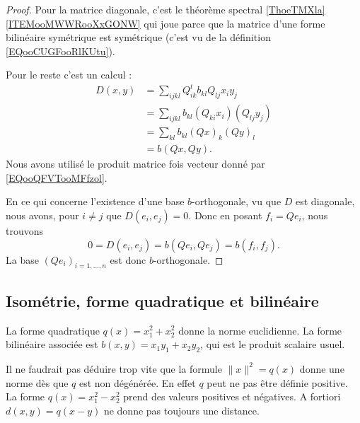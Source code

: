 \begin{proof}
    Pour la matrice diagonale, c'est le théorème spectral \ref{ThoeTMXla}\ref{ITEMooMWWRooXxGONW} qui joue parce que la matrice d'une forme bilinéaire symétrique est symétrique (c'est vu de la définition \eqref{EQooCUGFooRlKUtu}).

    Pour le reste c'est un calcul :
    \begin{subequations}
        \begin{align}
            D(x,y)&=\sum_{ijkl}Q^t_{ik}b_{kl}Q_{lj}x_iy_j\\
            &=\sum_{ijkl}b_{kl}(Q_{ki}x_i)(Q_{lj}y_j)\\
            &=\sum_{kl}b_{kl}(Qx)_k(Qy)_l\\
            &=b(Qx,Qy).
        \end{align}
    \end{subequations}
    Nous avons utilisé le produit matrice fois vecteur donné par \eqref{EQooQFVTooMFfzol}.

    En ce qui concerne l'existence d'une base \( b\)-orthogonale, vu que \( D\) est diagonale, nous avons, pour \( i\neq j\) que \( D(e_i,e_j)=0\). Donc en posant \( f_i=Qe_i\), nous trouvons
    \begin{equation}
        0=D(e_i,e_j)=b(Qe_i,Qe_j)=b(f_i,f_j).
    \end{equation}
    La base \( (Qe_i)_{i=1,\ldots, n}\) est donc \( b\)-orthogonale.
\end{proof}

\subsection{Isométrie, forme quadratique et bilinéaire}

\begin{example}
    La forme quadratique \( q(x)=x_1^2+x_2^2\) donne la norme euclidienne. La forme bilinéaire associée est \( b(x,y)=x_1y_1+x_2y_2\), qui est le produit scalaire usuel.
\end{example}

Il ne faudrait pas déduire trop vite que la formule \( \| x \|^2=q(x)\) donne une norme dès que \( q\) est non dégénérée. En effet \( q\) peut ne pas être définie positive. La forme \( q(x)=x_1^2-x_2^2\) prend des valeurs positives et négatives. A fortiori \( d(x,y)=q(x-y)\) ne donne pas toujours une distance.

